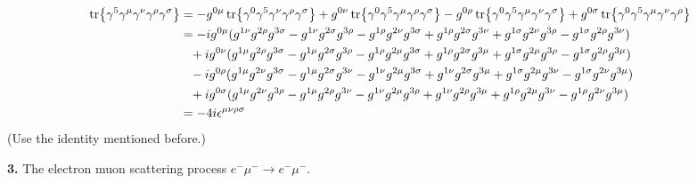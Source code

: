 \documentclass{article}
\newcommand{\gm}{\gamma^{\mu}}
\newcommand{\gn}{\gamma^{\nu}}
\newcommand{\gs}{\gamma^{\sigma}}
\newcommand{\gr}{\gamma^{\rho}}
\newcommand{\g}{\gamma}
\newcommand{\s}{\sigma}
\begin{document}
\begin{enumerate}[(i)]
  \begin{align*}
    \tr{\g^5\gm\gn\gr\gs}&=-g^{0\mu}\tr{\g^0\g^5\gn\gr\gs}+g^{0\nu}\tr{\g^0\g^5\gm\gr\gs}-g^{0\rho}\tr{\g^0\g^5\gm\gn\gs}+g^{0\s}\tr{\g^0\g^5\gm\gn\gr}\\
    &=-ig^{0\mu}(g^{1\nu}g^{2\rho}g^{3\s}-g^{1\nu}g^{2\s}g^{3\rho}-g^{1\rho}g^{2\nu}g^{3\s}+g^{1\rho}g^{2\s}g^{3\nu}+g^{1\s}g^{2\nu}g^{3\rho}-g^{1\s}g^{2\rho}g^{3\nu})\\
    &\phantom{=}+ig^{0\nu}(g^{1\mu}g^{2\rho}g^{3\s}-g^{1\mu}g^{2\s}g^{3\rho}-g^{1\rho}g^{2\mu}g^{3\s}+g^{1\rho}g^{2\s}g^{3\mu}+g^{1\s}g^{2\mu}g^{3\rho}-g^{1\s}g^{2\rho}g^{3\mu})\\
    &\phantom{=}-ig^{0\rho}(g^{1\mu}g^{2\nu}g^{3\s}-g^{1\mu}g^{2\s}g^{3\nu}-g^{1\nu}g^{2\mu}g^{3\s}+g^{1\nu}g^{2\s}g^{3\mu}+g^{1\s}g^{2\mu}g^{3\nu}-g^{1\s}g^{2\nu}g^{3\mu})\\
    &\phantom{=}+ig^{0\s}(g^{1\mu}g^{2\nu}g^{3\rho}-g^{1\mu}g^{2\rho}g^{3\nu}-g^{1\nu}g^{2\mu}g^{3\rho}+g^{1\nu}g^{2\rho}g^{3\mu}+g^{1\rho}g^{2\mu}g^{3\nu}-g^{1\rho}g^{2\nu}g^{3\mu})\\
    &=-4i\epsilon^{\mu\nu\rho\s}
  \end{align*}
  (Use the identity mentioned before.)
\end{enumerate}

{\bf3.}\quad
The electron muon scattering process $e^-\mu^-\rightarrow e^-\mu^-$.
\end{document}
